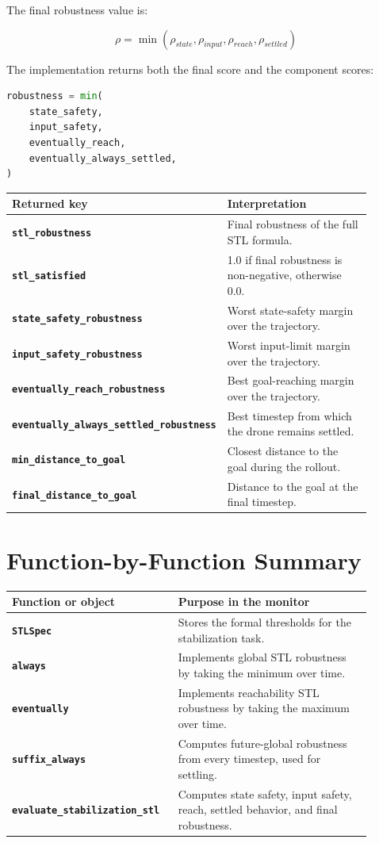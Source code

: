 \documentclass[11pt]{article}
\newcommand{\code}[1]{\texttt{#1}}
\newcommand{\metric}[1]{{\footnotesize\texttt{#1}}}
\newcommand{\rob}{\rho}
\begin{document}
The final robustness value is:

\[
\rob =
\min(
\rob_{state},
\rob_{input},
\rob_{reach},
\rob_{settled}
)
\]

The implementation returns both the final score and the component scores:

\begin{lstlisting}[language=Python]
robustness = min(
    state_safety,
    input_safety,
    eventually_reach,
    eventually_always_settled,
)
\end{lstlisting}

\begin{center}
\begin{tabular}{>{\bfseries}p{0.47\linewidth}p{0.43\linewidth}}
\toprule
Returned key & Interpretation \\
\midrule
\metric{stl\_robustness} & Final robustness of the full STL formula. \\
\metric{stl\_satisfied} & 1.0 if final robustness is non-negative, otherwise 0.0. \\
\metric{state\_safety\_robustness} & Worst state-safety margin over the trajectory. \\
\metric{input\_safety\_robustness} & Worst input-limit margin over the trajectory. \\
\metric{eventually\_reach\_robustness} & Best goal-reaching margin over the trajectory. \\
\metric{eventually\_always\_settled\_robustness} & Best timestep from which the drone remains settled. \\
\metric{min\_distance\_to\_goal} & Closest distance to the goal during the rollout. \\
\metric{final\_distance\_to\_goal} & Distance to the goal at the final timestep. \\
\bottomrule
\end{tabular}
\end{center}

\section{Function-by-Function Summary}

\begin{center}
\begin{tabular}{>{\bfseries}p{0.39\linewidth}p{0.51\linewidth}}
\toprule
Function or object & Purpose in the monitor \\
\midrule
\code{STLSpec} & Stores the formal thresholds for the stabilization task. \\
\code{always} & Implements global STL robustness by taking the minimum over time. \\
\code{eventually} & Implements reachability STL robustness by taking the maximum over time. \\
\code{suffix\_always} & Computes future-global robustness from every timestep, used for settling. \\
\metric{evaluate\_stabilization\_stl} & Computes state safety, input safety, reach, settled behavior, and final robustness. \\
\bottomrule
\end{tabular}
\end{center}
\end{document}
